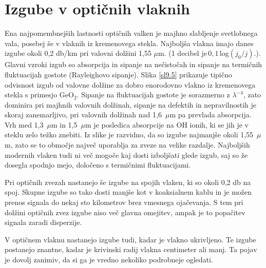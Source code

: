 \section{Izgube v optičnih vlaknih}

Ena najpomembnejših lastnosti optičnih valken je majhno slabljenje
svetlobnega vala, posebej še v vlaknih iz kremenovega stekla. Najboljša
vlakna imajo danes izgube okoli 0,2 db/km pri valovni dolžini 1,55
$\mu$m. (1 decibel je$\,0,1\,$log$(j_{0}/j).$). Glavni vzroki izgub
so absorpcija in sipanje na nečistočah in sipanje na termičnih fluktuacijah
gostote (Rayleighovo sipanje). Slika \ref{sl9.5} prikazuje tipično
odvisnost izgub od valovne dolžine za dobro enorodovno vlakno iz kremenovega
stekla s primesjo GeO$_{2}.$ Sipanje na fluktuacijah gostote je sorazmerno
z $\lambda^{-4}$, zato dominira pri majhnih valovnih dolžinah, sipanje
na defektih in nepravilnostih je skoraj zanemarljivo, pri valovnih
dolžinah nad 1,6~$\mu$m pa prevlada absorpcija. Vrh med 1,3~$\mu$m
in 1,5~$\mu$m je posledica absorpcije na OH ionih, ki se jih je
v steklu zelo težko znebiti. Iz slike je razvidno, da so izgube najmanjše
okoli 1,55~$\mu$m, zato se to območje največ uporablja za zveze
na velike razdalje. Najboljših modernih vlaken tudi ni več mogoče
kaj dosti izboljšati glede izgub, saj so že dosegla spodnjo mejo,
določeno s termičnimi fluktuacijami.

Pri optičnih zvezah nastanejo še izgube na spojih vlaken, ki so okoli
0,2 db na spoj. Skupne izgube so tako dosti manjše kot v koaksialnem
kablu in je možen prenos signala do nekaj sto kilometrov brez vmesnega
ojačevanja. S tem pri dolžini optičnih zvez izgube niso več glavna
omejitev, ampak je to popačitev signala zaradi disperzije.

V optičnem vlaknu nastanejo izgube tudi, kadar je vlakno ukrivljeno.
Te izgube postanejo znantne, kadar je krivinski radij vlakna centimeter
ali manj. Ta pojav je dovolj zanimiv, da si ga je vredno nekoliko
podrobneje ogledati.

